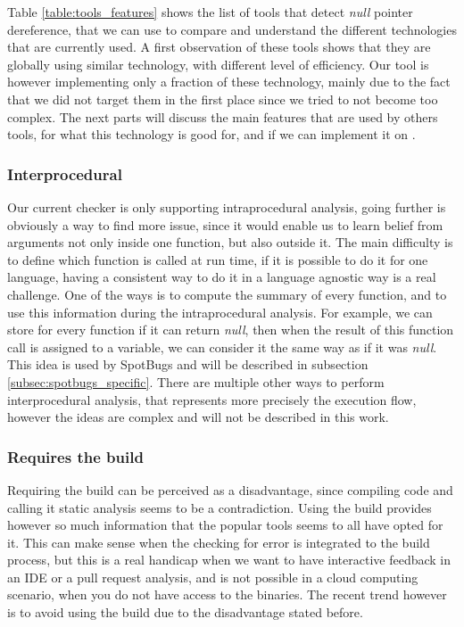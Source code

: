 Table \ref{table:tools_features} shows the list of tools that detect \emph{null} pointer dereference, that we can use to compare and understand the different technologies that are currently used.
A first observation of these tools shows that they are globally using similar technology, with different level of efficiency.
Our tool is however implementing only a fraction of these technology, mainly due to the fact that we did not target them in the first place since we tried to not become too complex. 
The next parts will discuss the main features that are used by others tools, for what this technology is good for, and if we can implement it on \slang{}.

\subsubsection{Interprocedural}
\label{subsubsec:inter_procedrual}

Our current checker is only supporting intraprocedural analysis, going further is obviously a way to find more issue, since it would enable us to learn belief from arguments not only inside one function, but also outside it.
The main difficulty is to define which function is called at run time, if it is possible to do it for one language, having a consistent way to do it in a language agnostic way is a real challenge. 
One of the ways is to compute the summary of every function, and to use this information during the intraprocedural analysis. 
For example, we can store for every function if it can return \emph{null}, then when the result of this function call is assigned to a variable, we can consider it the same way as if it was \emph{null}. 
This idea is used by SpotBugs and will be described in subsection \ref{subsec:spotbugs_specific}. 
There are multiple other ways to perform interprocedural analysis, that represents more precisely the execution flow, however the ideas are complex and will not be described in this work.

\subsubsection{Requires the build}
\label{subsubsec:require_build}

Requiring the build can be perceived as a disadvantage, since compiling code and calling it static analysis seems to be a contradiction.
Using the build provides however so much information that the popular tools seems to all have opted for it.
This can make sense when the checking for error is integrated to the build process, but this is a real handicap when we want to have interactive feedback in an IDE or a pull request analysis, and is not possible in a cloud computing scenario, when you do not have access to the binaries. 
The recent trend however is to avoid using the build due to the disadvantage stated before.

